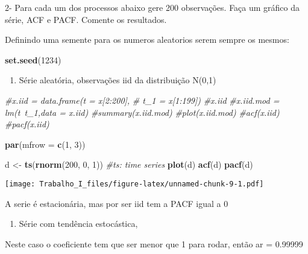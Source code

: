 \documentclass[]{article}
\newenvironment{Shaded}{\begin{snugshade}}{\end{snugshade}}
\newcommand{\KeywordTok}[1]{\textcolor[rgb]{0.13,0.29,0.53}{\textbf{#1}}}
\newcommand{\DataTypeTok}[1]{\textcolor[rgb]{0.13,0.29,0.53}{#1}}
\newcommand{\DecValTok}[1]{\textcolor[rgb]{0.00,0.00,0.81}{#1}}
\newcommand{\StringTok}[1]{\textcolor[rgb]{0.31,0.60,0.02}{#1}}
\newcommand{\CommentTok}[1]{\textcolor[rgb]{0.56,0.35,0.01}{\textit{#1}}}
\newcommand{\NormalTok}[1]{#1}
\providecommand{\tightlist}{%
  \setlength{\itemsep}{0pt}\setlength{\parskip}{0pt}}
\begin{document}
2- Para cada um dos processos abaixo gere 200 observações. Faça um
gráfico da série, ACF e PACF. Comente os resultados.

Definindo uma semente para os numeros aleatorios serem sempre os mesmos:

\begin{Shaded}
\begin{Highlighting}[]
\KeywordTok{set.seed}\NormalTok{(}\DecValTok{1234}\NormalTok{)}
\end{Highlighting}
\end{Shaded}

\begin{enumerate}
\def\labelenumi{\alph{enumi})}
\setcounter{enumi}{3}
\tightlist
\item
  Série aleatória, observações iid da distribuição N(0,1)
\end{enumerate}

\begin{Shaded}
\begin{Highlighting}[]
\CommentTok{#x.iid = data.frame(t = x[2:200],}
\CommentTok{#                 t_1 = x[1:199])}
\CommentTok{#x.iid}
\CommentTok{#x.iid.mod = lm(t~t_1,data = x.iid)}
\CommentTok{#summary(x.iid.mod)}
\CommentTok{#plot(x.iid.mod)}
\CommentTok{#acf(x.iid)}
\CommentTok{#pacf(x.iid)}

\KeywordTok{par}\NormalTok{(}\DataTypeTok{mfrow =} \KeywordTok{c}\NormalTok{(}\DecValTok{1}\NormalTok{, }\DecValTok{3}\NormalTok{))}

\NormalTok{d <-}\StringTok{ }\KeywordTok{ts}\NormalTok{(}\KeywordTok{rnorm}\NormalTok{(}\DecValTok{200}\NormalTok{, }\DecValTok{0}\NormalTok{, }\DecValTok{1}\NormalTok{)) }\CommentTok{#ts: time series}
\KeywordTok{plot}\NormalTok{(d)}
\KeywordTok{acf}\NormalTok{(d)}
\KeywordTok{pacf}\NormalTok{(d)}
\end{Highlighting}
\end{Shaded}

\texttt{[image: Trabalho\_I\_files/figure-latex/unnamed-chunk-9-1.pdf]}

A serie é estacionária, mas por ser iid tem a PACF igual a 0

\begin{enumerate}
\def\labelenumi{\alph{enumi})}
\setcounter{enumi}{4}
\tightlist
\item
  Série com tendência estocástica,
\end{enumerate}

Neste caso o coeficiente tem que ser menor que 1 para rodar, então ar =
0.99999
\end{document}
